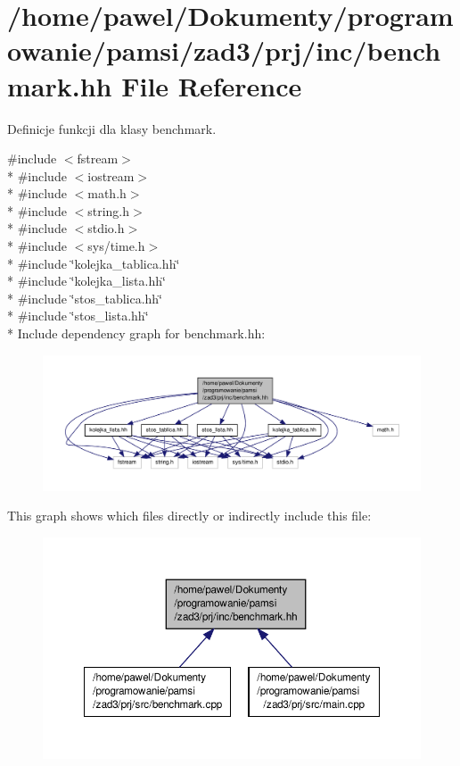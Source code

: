 \hypertarget{benchmark_8hh}{\section{/home/pawel/\-Dokumenty/programowanie/pamsi/zad3/prj/inc/benchmark.hh File Reference}
\label{benchmark_8hh}
}


Definicje funkcji dla klasy benchmark.  


{\ttfamily \#include $<$fstream$>$}\\*
{\ttfamily \#include $<$iostream$>$}\\*
{\ttfamily \#include $<$math.\-h$>$}\\*
{\ttfamily \#include $<$string.\-h$>$}\\*
{\ttfamily \#include $<$stdio.\-h$>$}\\*
{\ttfamily \#include $<$sys/time.\-h$>$}\\*
{\ttfamily \#include \char`\"{}kolejka\-\_\-tablica.\-hh\char`\"{}}\\*
{\ttfamily \#include \char`\"{}kolejka\-\_\-lista.\-hh\char`\"{}}\\*
{\ttfamily \#include \char`\"{}stos\-\_\-tablica.\-hh\char`\"{}}\\*
{\ttfamily \#include \char`\"{}stos\-\_\-lista.\-hh\char`\"{}}\\*
Include dependency graph for benchmark.\-hh\-:\nopagebreak
\begin{figure}[H]
\begin{center}
\leavevmode
\includegraphics[width=350pt]{benchmark_8hh__incl}
\end{center}
\end{figure}
This graph shows which files directly or indirectly include this file\-:\nopagebreak
\begin{figure}[H]
\begin{center}
\leavevmode
\includegraphics[width=350pt]{benchmark_8hh__dep__incl}
\end{center}
\end{figure}
